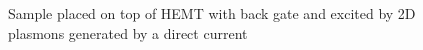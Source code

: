 \documentclass[11pt]{article}
\begin{document}
%
%
\begin{figure}[t!]
  \centering
  \def\svgwidth{.75\linewidth}
  
  \caption{Sample placed on top of HEMT with back gate and excited by 2D plasmons generated by a direct current}
  \label{fig:struct}
\end{figure}
%










\clearpage %
% 


\end{document}
